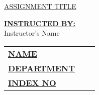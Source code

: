\documentclass[12pt,a4paper]{article}
\begin{document}
\begin{titlepage}
	
	
	\begin{flushright}
		\textbf{\uppercase{\fontsize{12}{18} \selectfont {Assignment No: 01}}}
	\end{flushright}
	
	
	
	
	
	
	\vspace*{\fill}
	\begin{center}
		\uppercase{\fontsize{30}{45}\selectfont \ul{Assignment Title}}
	\end{center}
	\vfill %
	
	
	\begin{multicols}{2}
		
		\noindent\textbf{\underline{INSTRUCTED BY:}} \\Instructor's Name
		
		
		\columnbreak
		
		
		
		\begin{tabular}{lll}
			\vspace{6pt}
			
			\textbf{\uppercase{\underline{Name}}}       & \textbf{\uppercase{\fontsize{12}{18} \selectfont {:}}} {\fontsize{12}{18} \selectfont {<Name>}}        \\
			
			\vspace{6pt}
			\textbf{\uppercase{\underline{Department}}} & \textbf{\uppercase{\fontsize{12}{18} \selectfont {:}}} {\fontsize{12}{18} \selectfont {<Department>}}       \\
			
			\vspace{6pt}
			\textbf{\uppercase{\underline{Index No}}}   & \textbf{\uppercase{\fontsize{12}{18} \selectfont {:}}} {\fontsize{12}{18} \selectfont {<Index No>}}          \\

			
			
		\end{tabular}
	\end{multicols}
	
\end{titlepage}
\end{document}
